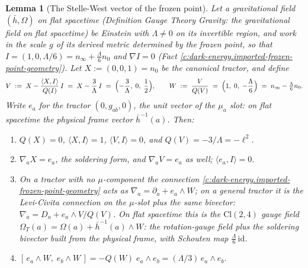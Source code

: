 \documentclass[11pt]{article}
\newtheorem{lemma}[theorem]{Lemma}
\theoremstyle{definition}
\theoremstyle{plain}
\newcommand{\changedmark}[2]{\marginpar{\raggedright\scriptsize\color{#1}#2}}
\providecommand{\Cl}{}\renewcommand{\Cl}{\mathrm{Cl}}
\providecommand{\hb}{}\renewcommand{\hb}{\bar{h}}
\providecommand{\nInf}{}\renewcommand{\nInf}{n_\infty}
\providecommand{\nO}{}\renewcommand{\nO}{n_0}
\providecommand{\ip}{}\renewcommand{\ip}[2]{\langle #1, #2\rangle}
\begin{document}
\begin{lemma}[The Stelle-West vector of the frozen point]\label{c:dark-energy.stelle-west-vector-frozen-point}
\changedmark{gray}{reworded}
Let a gravitational field $(\hb, \Omega)$ on flat spacetime (Definition \emph{Gauge Theory Gravity: the gravitational field on flat spacetime}) be Einstein with $\Lambda \neq 0$ on its invertible region, and work in the scale $g$ of its derived metric determined by the frozen point, so that $I = (1, 0, \Lambda/6) = \nInf + \tfrac{\Lambda}{6}\nO$ and $\nabla I = 0$ (Fact \ref{c:dark-energy.imported-frozen-point-geometry}). Let $X := (0, 0, 1) = \nO$ be the canonical tractor, and define
\[
V \;:=\; X - \frac{\ip{X}{I}}{Q(I)}\, I \;=\; X - \frac{3}{\Lambda}\, I \;=\; \Bigl(-\frac{3}{\Lambda},\; 0,\; \frac12\Bigr),
\qquad
W \;:=\; \frac{V}{Q(V)} \;=\; \Bigl(1,\; 0,\; -\frac{\Lambda}{6}\Bigr) \;=\; \nInf - \tfrac{\Lambda}{6}\nO .
\]
Write $e_a$ for the tractor $(0, g_{ab}, 0)$, the unit vector of the $\mu_a$ slot: on flat spacetime the physical frame vector $\hb^{-1}(a)$. Then:
\begin{enumerate}
\item[(i)] $Q(X) = 0$, $\ip{X}{I} = 1$, $\ip{V}{I} = 0$, and $Q(V) = -3/\Lambda = -\ell^2$.
\item[(ii)] $\nabla_a X = e_a$, the soldering form, and $\nabla_a V = e_a$ as well; $\ip{e_a}{I} = 0$.
\item[(iii)] On a tractor with no $\mu$-component the connection \ref{c:dark-energy.imported-frozen-point-geometry} acts as $\nabla_a = \partial_a + e_a\wedge W$; on a general tractor it is the Levi-Civita connection on the $\mu$-slot plus the same bivector: $\nabla_a = D_a + e_a\wedge V/Q(V)$. On flat spacetime this is the $\Cl(2,4)$ gauge field $\Omega_{T}(a) = \Omega(a) + \hb^{-1}(a) \wedge W$: the rotation-gauge field plus the soldering bivector built from the physical frame, with Schouten map $\tfrac{\Lambda}{6}\,\mathrm{id}$.
\item[(iv)] $[\,e_a\wedge W,\; e_b\wedge W\,] = -Q(W)\; e_a\wedge e_b = (\Lambda/3)\, e_a\wedge e_b$.
\end{enumerate}
\end{lemma}
\end{document}

